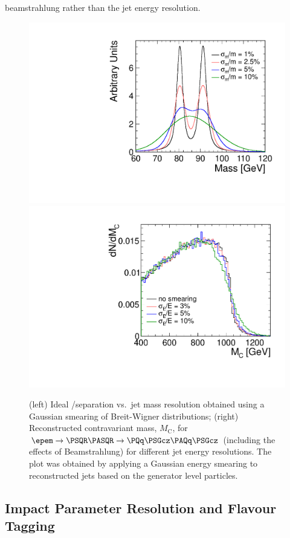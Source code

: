 beamstrahlung rather than the jet energy resolution.
\begin{figure}[hbt]
\centering
\includegraphics[width=0.49\linewidth]{../Chap3_ExpCond_PhysPerfsReqs/wzSeparation.pdf}
\includegraphics[width=0.49\linewidth]{../Chap3_ExpCond_PhysPerfsReqs/SquarkEndpoint.pdf}
\caption{(left) Ideal \PW/\PZ separation vs.\ jet mass resolution obtained using
a Gaussian smearing of Breit-Wigner distributions; (right) Reconstructed
contravariant mass, $M_\mathrm{C}$, for
$\epem\rightarrow\PSQR\PASQR\rightarrow\PQq\PSGcz\PAQq\PSGcz$ (including the
effects of Beamstrahlung) for different jet energy resolutions. The plot was
obtained by applying a Gaussian energy smearing to reconstructed jets based on
the generator level particles.  \label{fig:chap3:jetRequirements}}

\end{figure}

\subsection{Impact Parameter Resolution and Flavour Tagging\label{sec:chapter3:requirements:flavourtagging}}

